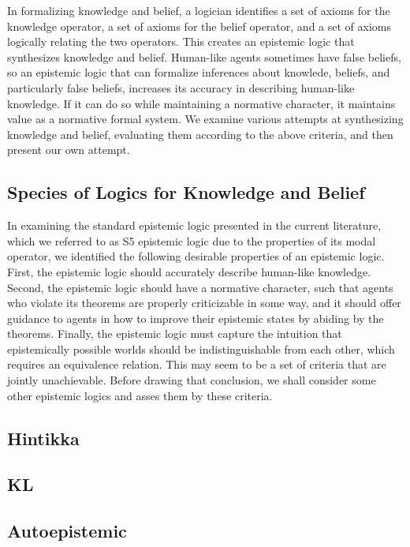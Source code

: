 In formalizing knowledge and belief, a logician identifies a set of axioms for the knowledge operator, a set of axioms for the belief operator, and a set of axioms logically relating the two operators. This creates an epistemic logic that synthesizes knowledge and belief. Human-like agents sometimes have false beliefs, so an epistemic logic that can formalize inferences about knowlede, beliefs, and particularly false beliefs, increases its accuracy in describing human-like knowledge. If it can do so while maintaining a normative character, it maintains value as a normative formal system. We examine various attempts at synthesizing knowledge and belief, evaluating them according to the above criteria, and then present our own attempt.

\subsection{Species of Logics for Knowledge and Belief}
\label{sec:ep_logs}

In examining the standard epistemic logic presented in the current literature, which we referred to as S5 epistemic logic due to the properties of its modal operator, we identified the following desirable properties of an epistemic logic. First, the epistemic logic should accurately describe human-like knowledge. Second, the epistemic logic should have a normative character, such that agents who violate its theorems are properly criticizable in some way, and it should offer guidance to agents in how to improve their epistemic states by abiding by the theorems. Finally, the epistemic logic must capture the intuition that epistemically possible worlds should be indistinguishable from each other, which requires an equivalence relation. This may seem to be a set of criteria that are jointly unachievable. Before drawing that conclusion, we shall consider some other epistemic logics and asses them by these criteria.

\subsection{Hintikka}

\subsection{KL}

\subsection{Autoepistemic}

